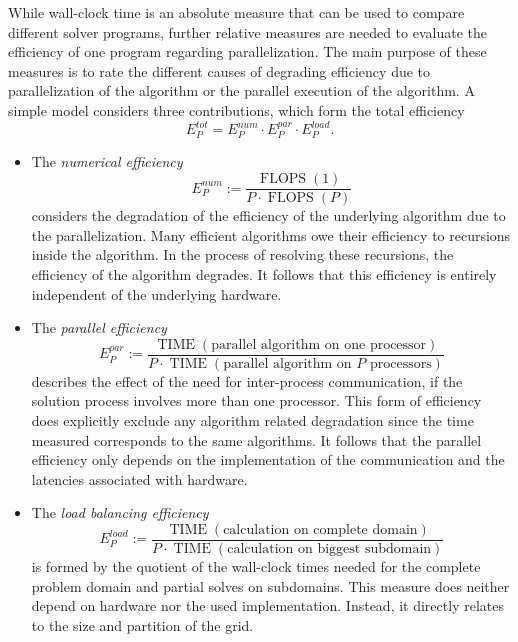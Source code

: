While wall-clock time is an absolute measure that can be used to compare different solver programs, further relative measures are needed to evaluate the efficiency of one program regarding parallelization. The main purpose of these measures is to rate the different causes of degrading efficiency due to parallelization of the algorithm or the parallel execution of the algorithm. A simple model \cite{ferziger02,schaefer99} considers three contributions, which form the total efficiency
\begin{equation}
  \label{eq:efficiency}
  E^{tot}_P = E^{num}_P \cdot E^{par}_P \cdot E^{load}_P.
\end{equation}
\begin{itemize}
  \item[] The \emph{numerical efficiency}
  \begin{displaymath} E^{num}_P := \frac{\operatorname{FLOPS}(1)}{P \cdot \operatorname{FLOPS}(P)}\end{displaymath} 
    considers the degradation of the efficiency of the underlying algorithm due to the parallelization. Many efficient algorithms owe their efficiency to recursions inside the algorithm. In the process of resolving these recursions, the efficiency of the algorithm degrades. It follows that this efficiency is entirely independent of the underlying hardware.
  \item[] The \emph{parallel efficiency}
    \begin{displaymath} E^{par}_P :=\frac{\operatorname{TIME}(\text{parallel algorithm on one processor})}{P \cdot \operatorname{TIME}(\text{parallel algorithm on \(P\) processors})} \end{displaymath} 
      describes the effect of the need for inter-process communication, if the solution process involves more than one processor. This form of efficiency does explicitly exclude any algorithm related degradation since the time measured corresponds to the same algorithms. It follows that the parallel efficiency only depends on the implementation of the communication and the latencies associated with hardware.
  \item[] The \emph{load balancing efficiency} 
    \begin{displaymath} E^{load}_P :=\frac{\operatorname{TIME}(\text{calculation on complete domain})}{P \cdot \operatorname{TIME}(\text{calculation on biggest subdomain})} \end{displaymath}
       is formed by the quotient of the wall-clock times needed for the complete problem domain and partial solves on subdomains. This measure does neither depend on hardware nor the used implementation. Instead, it directly relates to the size and partition of the grid. 
\end{itemize}

